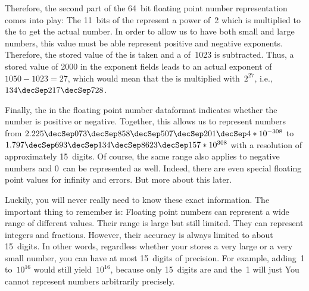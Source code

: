 Therefore, the second part of the 64~bit floating point number representation comes into play:
The 11~bits of the  represent a power of~2 which is multiplied to the  to get the actual number.
In order to allow us to have both small and large numbers, this value must be able represent positive and negative exponents.
Therefore, the stored value of the  is taken and a  of~1023 is subtracted.
Thus, a stored value of 2000 in the exponent fields leads to an actual exponent of $1050-1023=27$, which would mean that the  is multiplied with~$2^{27}$, i.e., $134\decSep217\decSep728$.%
%
\begin{sloppypar}%
Finally, the  in the floating point number dataformat indicates whether the number is positive or negative.
Together, this allows us to represent numbers from $2.225\decSep073\decSep858\decSep507\decSep201\decSep4*10^{-308}$ to $1.797\decSep693\decSep134\decSep8623\decSep157*10^{308}$ with a resolution of approximately 15~digits.
Of course, the same range also applies to negative numbers and $0$~can be represented as well.
Indeed, there are even special floating point values for infinity and errors.
But more about this later.%
\end{sloppypar}%
%
Luckily, you will never really need to know these exact information.
The important thing to remember is:
Floating point numbers can represent a wide range of different values.
Their range is large but still limited.
They can represent integers and fractions.
However, their accuracy is always limited to about 15~digits.
In other words, regardless whether your  stores a very large or a very small number, you can have at most 15~digits of precision.
For example, adding~1 to~$10^{16}$ would still yield~$10^{16}$, because only 15~digits are  and the~1 will just 
You cannot represent numbers arbitrarily precisely.%
\endhsection%
%
\endhsection%
%
